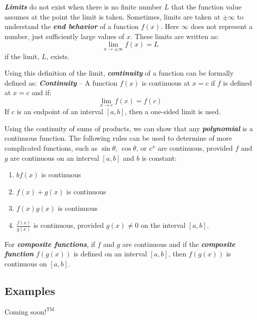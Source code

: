 \vspace{0.1in}
\textbf{\textit{Limits}} do not exist when there is no finite number $L$ that the function value assumes at the point the limit is taken. Sometimes, limits are taken at $\pm\infty$ to understand the \textbf{\textit{end behavior}} of a function $f(x)$. Here $\infty$ does not represent a number, just sufficiently large values of $x$. These limits are written as:
\begin{equation}
\lim_{x\rightarrow \pm\infty} f(x) = L
\end{equation}
if the limit, $L$, exists.

\vspace{0.1in}
Using this definition of the limit, \textbf{\textit{continuity}} of a function can be formally defined as:
\textbf{\textit{Continuity}} -- A function $f(x)$ is continuous at $x = c$ if $f$ is defined at $x = c$ and if:
\begin{equation}
\lim_{x \rightarrow c} f(x) = f(c)
\end{equation}
If $c$ is an endpoint of an interval $[a, b]$, then a one-sided limit is used.

\vspace{0.1in}
Using the continuity of sums of products, we can show that any \textbf{\textit{polynomial}} is a continuous function. The following rules can be used to determine of more complicated functions, such as $\sin\theta$, $\cos\theta$, or $e^x$ are continuous, provided $f$ and $g$ are continuous on an interval $[a, b]$ and $b$ is constant:
\begin{enumerate}
\item $bf(x)$ is continuous\\
\vspace{-0.25in}
\item $f(x) + g(x)$ is continuous\\
\vspace{-0.25in}
\item $f(x)g(x)$ is continuous\\
\vspace{-0.25in}
\item $\frac{f(x)}{g(x)}$ is continuous, provided $g(x) \neq 0$ on the interval $[a,b]$.
\end{enumerate}

For \textbf{\textit{composite functions}}, if $f$ and $g$ are continuous and if the \textbf{\textit{composite function}} $f(g(x))$ is defined on an interval $[a, b]$, then $f(g(x))$ is continuous on $[a, b]$.

\begin{center}
\section*{\small Examples}
Coming soon$!^{\text{TM}}$
\end{center}